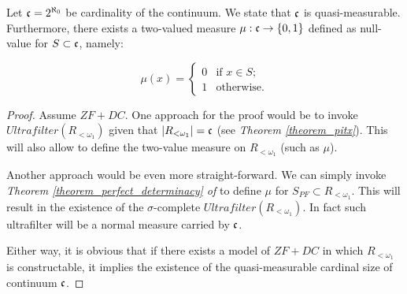 \begin{theorem}\label{theorem_cont_quasi_measurable}
  Let $\mathfrak{c} = 2^{\aleph_0}$ be cardinality of the continuum. We state that $\mathfrak{c}$ is quasi-measurable. Furthermore, there exists a two-valued measure $\mu: \mathfrak{c} \to \{0,1\}$ defined as null-value for $S \subset \mathfrak{c}$, namely:

      \[
    \mu(x) = 
    \begin{cases} 
    0 & \text{if } x \in S; \\
    1 & \text{otherwise}.
    \end{cases}
    \]

\end{theorem}
\begin{proof}
  Assume $ZF+DC$. One approach for the proof would be to invoke $Ultrafilter(R_{<\omega_1})$ given that $|R_{<\omega_1}| = \mathfrak{c}$ (see \textit{Theorem \ref{theorem_pitx}}). This will also allow to define the two-value measure on $R_{<\omega_1}$ (such as $\mu$). 

  Another approach would be even more straight-forward. We can simply invoke \textit{Theorem \ref{theorem_perfect_determinacy} of } to define $\mu$ for $S_{PF} \subset R_{<\omega_1}$. This will result in the existence of the $\sigma$-complete $Ultrafilter(R_{<\omega_1})$. In fact such ultrafilter will be a normal measure carried by $\mathfrak{c}$.

  Either way, it is obvious that if there exists a model of $ZF+DC$ in which $R_{<\omega_1}$ is constructable, it implies the existence of the quasi-measurable cardinal size of continuum $\mathfrak{c}$.
\end{proof}

